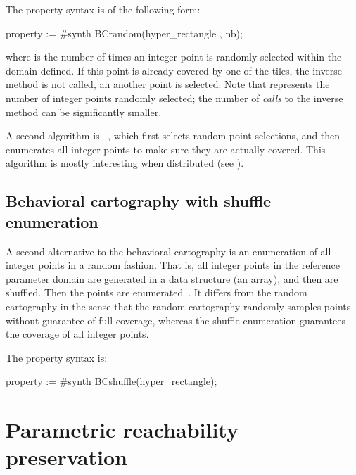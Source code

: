 The property syntax is of the following form:

\begin{IMITATORproperty}
property := #synth BCrandom(hyper_rectangle , nb);
\end{IMITATORproperty}


\noindent{}where  is the number of times an integer point is randomly selected within the domain defined.
If this point is already covered by one of the tiles, the inverse method is not called, an another point is selected.
Note that  represents the number of integer points randomly selected; the number of \emph{calls} to the inverse method can be significantly smaller.

A second algorithm is ~\cite{ACE14}, which first selects random point selections, and then enumerates all integer points to make sure they are actually covered.
This algorithm is mostly interesting when distributed (see \cite{ACE14,ACN15}).


\subsection*{Behavioral cartography with shuffle enumeration}\label{sss:mode:BC:shuffle}

A second alternative to the behavioral cartography is an enumeration of all integer points in a random fashion.
That is, all integer points in the reference parameter domain are generated in a data structure (an array), and then are shuffled.
Then the points are enumerated~\cite{ACN15}.
It differs from the random cartography in the sense that the random cartography randomly samples points without guarantee of full coverage, whereas the shuffle enumeration guarantees the coverage of all integer points.

The property syntax is:

\begin{IMITATORproperty}
property := #synth BCshuffle(hyper_rectangle);
\end{IMITATORproperty}



\section{Parametric reachability preservation}\label{ss:mode:PRP}

